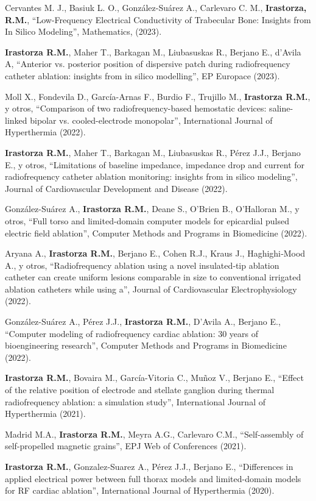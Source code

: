 \documentclass[margin,line]{res}
\begin{document}
\begin{resume}
Cervantes M. J., Basiuk L. O., González-Suárez A., Carlevaro C. M., \textbf{Irastorza, R.M.}, ``Low-Frequency Electrical Conductivity of Trabecular Bone: Insights from In Silico Modeling'', Mathematics, (2023).

\textbf{Irastorza R.M.}, Maher T., Barkagan M., Liubasuskas R., Berjano E., d’Avila A, ``Anterior vs. posterior position of dispersive patch during radiofrequency catheter ablation: insights from in silico modelling'', EP Europace (2023).

Moll X., Fondevila D., García-Arnas F., Burdio F., Trujillo M., \textbf{Irastorza R.M.}, y otros, ``Comparison of two radiofrequency-based hemostatic devices: saline-linked bipolar vs. cooled-electrode monopolar'', International Journal of Hyperthermia (2022).

\textbf{Irastorza R.M.}, Maher T., Barkagan M., Liubasuskas R., Pérez J.J., Berjano E., y otros, ``Limitations of baseline impedance, impedance drop and current for radiofrequency catheter ablation monitoring: insights from in silico modeling'', Journal of Cardiovascular Development and Disease (2022).

González-Suárez A., \textbf{Irastorza R.M.}, Deane S., O'Brien B., O'Halloran M., y otros, ``Full torso and limited-domain computer models for epicardial pulsed electric field ablation'', Computer Methods and Programs in Biomedicine (2022).

Aryana A., \textbf{Irastorza R.M.}, Berjano E., Cohen R.J., Kraus J., Haghighi‐Mood A., y otros, ``Radiofrequency ablation using a novel insulated‐tip ablation catheter can create uniform lesions comparable in size to conventional irrigated ablation catheters while using a'', Journal of Cardiovascular Electrophysiology (2022).

González-Suárez A., Pérez J.J., \textbf{Irastorza R.M.}, D'Avila A., Berjano E., ``Computer modeling of radiofrequency cardiac ablation: 30 years of bioengineering research'', Computer Methods and Programs in Biomedicine (2022).

\textbf{Irastorza R.M.}, Bovaira M., García-Vitoria C., Muñoz V., Berjano E., ``Effect of the relative position of electrode and stellate ganglion during thermal radiofrequency ablation: a simulation study'', International Journal of Hyperthermia (2021).

Madrid M.A., \textbf{Irastorza R.M.}, Meyra A.G., Carlevaro C.M., ``Self-assembly of self-propelled magnetic grains'', EPJ Web of Conferences (2021).

\textbf{Irastorza R.M.}, Gonzalez-Suarez A., Pérez J.J., Berjano E., ``Differences in applied electrical power between full thorax models and limited-domain models for RF cardiac ablation'', International Journal of Hyperthermia (2020).


\end{resume}
\end{document}
